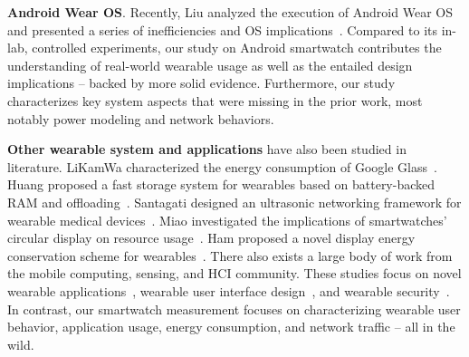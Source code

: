 \textbf{Android Wear OS}. Recently, Liu \etal analyzed the execution of Android Wear OS and presented a series of inefficiencies and OS implications~\cite{liu16_mobisys,liu15_apsys}.
Compared to its in-lab, controlled experiments, our study on Android smartwatch contributes the understanding of real-world wearable usage as well as the entailed design implications -- backed by more solid evidence.
Furthermore, our study characterizes key system aspects that were missing in the prior work, most notably power modeling and network behaviors.

\textbf{Other wearable system and applications} have also been studied in literature.
LiKamWa \etal characterized the energy consumption of Google Glass~\cite{likamwa13_apsys}.
%
Huang \etal proposed a fast storage system for wearables based on battery-backed RAM and offloading~\cite{huang15_atc}.
%
Santagati \etal designed an ultrasonic networking framework for wearable
medical devices~\cite{santagati15_mobisys}.
%
Miao \etal investigated the implications of smartwatches' circular display on resource usage~\cite{miao16_hotmobile}.
%
Ham \etal proposed a novel display energy conservation scheme for wearables~\cite{ham15_atc}.
%
There also exists a large body of work from the mobile computing, sensing, and HCI community. These studies focus on novel wearable applications~\cite{shen16_mobisys, nirjon15_mobisys,mayberry14_mobisys}, wearable user interface design~\cite{chen14_chi, plaumann16_iswc}, and wearable security~\cite{wang15_mobicom, liu15_ccs}.
%
In contrast, our smartwatch measurement focuses on characterizing wearable user behavior, application usage, energy consumption, and network traffic -- all in the wild.

